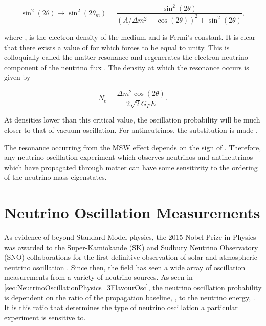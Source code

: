 \begin{equation}
  \label{eq:NeutrinoOscillationPhysics_2Flavour_MSW}
  \sin^{2}(2\theta) \rightarrow \sin^{2}(2\theta_{m}) = \frac{\sin^{2}(2\theta)}{(A/\Delta m^{2} - \cos(2\theta))^{2} + \sin^{2}(2\theta)},
\end{equation}

where ,  is the electron density of the medium and  is Fermi's constant. It is clear that there exists a value of  for  which forces  to be equal to unity. This is colloquially called the matter resonance and regenerates the electron neutrino component of the neutrino flux \cite{Smirnov2003-yb, msw, wolfenstein}. The density at which the resonance occurs is given by

\begin{equation}
  \label{eq:NeutrinoOscillationPhysics_ResonanceDensity}
  N_{e} = \frac{\Delta m^{2} \cos(2\theta)}{2\sqrt{2} G_{F} E}.
\end{equation}

At densities lower than this critical value, the oscillation probability will be much closer to that of vacuum oscillation. For antineutrinos, the  substitution is made \cite{Barger:1980tf}.

The resonance occurring from the MSW effect depends on the sign of . Therefore, any neutrino oscillation experiment which observes neutrinos and antineutrinos which have propagated through matter can have some sensitivity to the ordering of the neutrino mass eigenstates.

\section{Neutrino Oscillation Measurements}
\label{sec:NeutrinoOscillationPhysics_OscillationMeasurements}

As evidence of beyond Standard Model physics, the 2015 Nobel Prize in Physics was awarded to the Super-Kamiokande (SK) \cite{PhysRevLett.93.101801} and Sudbury Neutrino Observatory (SNO) \cite{PhysRevLett.89.011301} collaborations for the first definitive observation of solar and atmospheric neutrino oscillation \cite{2015NobelPhysicsPrize}. Since then, the field has seen a wide array of oscillation measurements from a variety of neutrino sources. As seen in \autoref{sec:NeutrinoOscillationPhysics_3FlavourOsc}, the neutrino oscillation probability is dependent on the ratio of the propagation baseline, , to the neutrino energy, . It is this ratio that determines the type of neutrino oscillation a particular experiment is sensitive to.

